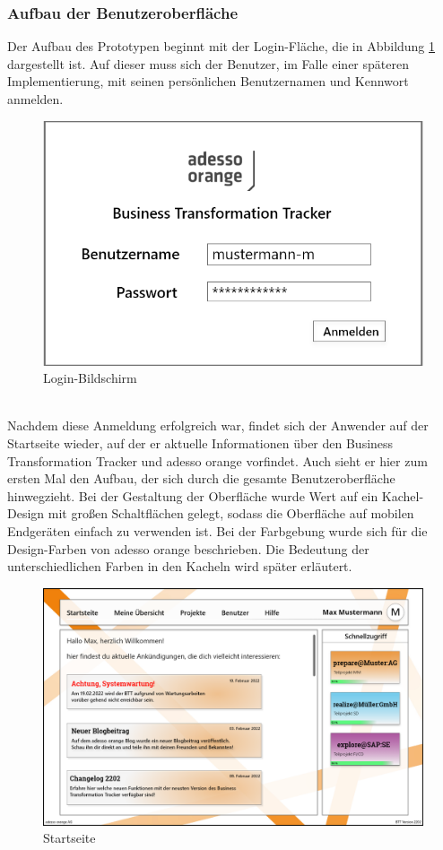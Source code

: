 \subsubsection{Aufbau der Benutzeroberfläche}
Der Aufbau des Prototypen beginnt mit der Login-Fläche, die in Abbildung \ref{fig:Login} dargestellt ist. Auf dieser muss sich der Benutzer, im Falle einer späteren Implementierung, mit seinen persönlichen Benutzernamen und Kennwort anmelden.
\begin{figure}[h!]
    \centering
    \includegraphics[scale=0.4]{./Prototyp/01_Login.png}
    \caption[Prototyp: Login-Bildschirm]{Login-Bildschirm}
    \label{fig:Login}
\end{figure}
\\Nachdem diese Anmeldung erfolgreich war, findet sich der Anwender auf der Startseite wieder, auf der er aktuelle Informationen über den Business Transformation Tracker und adesso orange vorfindet.
Auch sieht er hier zum ersten Mal den Aufbau, der sich durch die gesamte Benutzeroberfläche hinwegzieht. Bei der Gestaltung der Oberfläche wurde Wert auf ein \glqq{}Kachel-Design\grqq{} mit großen Schaltflächen gelegt, sodass die Oberfläche auf mobilen Endgeräten einfach zu verwenden ist. Bei der Farbgebung wurde sich für die Design-Farben von adesso orange beschrieben. Die Bedeutung der unterschiedlichen Farben in den Kacheln wird später erläutert. 
\begin{figure}[h!]
    \centering
    \includegraphics[scale=0.3]{./Prototyp/02_Startseite.png}
    \caption[Prototyp: Startseite]{Startseite}
    \label{fig:Startseite}
\end{figure}
